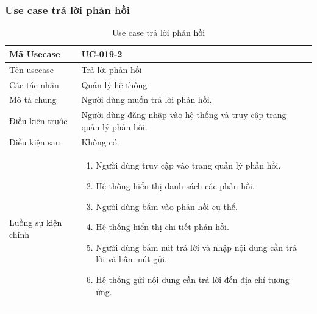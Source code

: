 \documentclass[12pt,a4paper]{article}
\begin{document}
    \subsubsection*{Use case trả lời phản hồi}
    \begin{table}[H]
        \centering
        \begin{tabular}{|p{3.5cm}|p{11.5cm}|c|}
            \hline
            Mã Usecase      & UC-019-2                                                              \\
            \hline
            Tên usecase     & Trả lời phản hồi                                                      \\
            \hline
            Các tác nhân    & Quản lý hệ thống                                                      \\
            \hline
            Mô tả chung     & Người dùng muốn trả lời phản hồi.                                     \\
            \hline

            Điều kiện trước & Người dùng đăng nhập vào hệ thống và truy cập trang quản lý phản hồi. \\
            \hline

            Điều kiện sau   & Không có.                                                             \\
            \hline

            Luồng sự kiện chính & \vspace{-.8cm}\begin{enumerate}
                                                    \item Người dùng truy cập vào trang quản lý phản hồi.
                                                    \item Hệ thống hiển thị danh sách các phản hồi.
                                                    \item Người dùng bấm vào phản hồi cụ thể.
                                                    \item Hệ thống hiển thị chi tiết phản hồi.
                                                    \item Người dùng bấm nút trả lời và nhập nội dung cần trả lời và bấm nút gửi.
                                                    \item Hệ thống gửi nội dung cần trả lời đến địa chỉ tương ứng.
            \end{enumerate}
            \\
            \hline
        \end{tabular}
        \caption{Use case trả lời phản hồi}

    \end{table}
\end{document}
